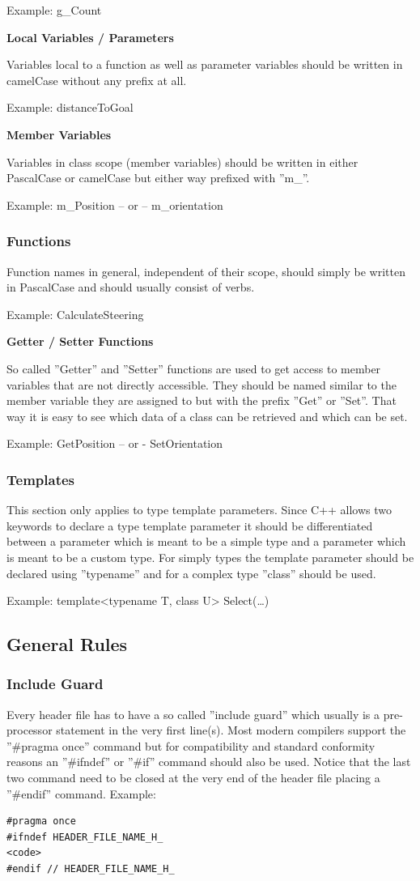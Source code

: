 Example: g\_Count

\textbf{Local Variables / Parameters}

Variables local to a function as well as parameter variables should be written in camelCase without any prefix at all.

Example: distanceToGoal

\textbf{Member Variables}

Variables in class scope (member variables) should be written in either PascalCase or camelCase but either way prefixed with ''m\_''.

Example: m\_Position – or – m\_orientation

\subsubsection{Functions}
Function names in general, independent of their scope, should simply be written in PascalCase and should usually consist of verbs.

Example: CalculateSteering

\textbf{Getter / Setter Functions}

So called ''Getter'' and ''Setter'' functions are used to get access to member variables that are not directly accessible. They should be named similar to the member variable they are assigned to but with the prefix ''Get'' or ''Set''. That way it is easy to see which data of a class can be retrieved and which can be set.

Example: GetPosition – or - SetOrientation

\subsubsection{Templates}
This section only applies to type template parameters. Since C++ allows two keywords to declare a type template parameter it should be differentiated between a parameter which is meant to be a simple type and a parameter which is meant to be a custom type. For simply types the template parameter should be declared using ''typename'' and for a complex type ''class'' should be used.

Example: template<typename T, class U> Select(…)

\subsection{General Rules}
\subsubsection{Include Guard}
Every header file has to have a so called ''include guard'' which usually is a pre-processor statement in the very first line(s). Most modern compilers support the ''\#pragma once'' command but for compatibility and standard conformity reasons an ''\#ifndef'' or ''\#if'' command should also be used. Notice that the last two command need to be closed at the very end of the header file placing a ''\#endif'' command.
Example:
\begin{lstlisting}[label={list:first}]
#pragma once
#ifndef HEADER_FILE_NAME_H_
<code>
#endif // HEADER_FILE_NAME_H_
\end{lstlisting}

